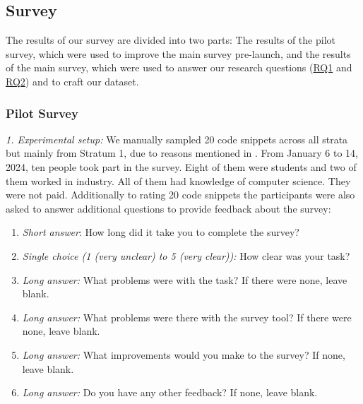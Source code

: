 \documentclass[%
class=scrreprt,
chapterprefix=false,%
open=right,%
twoside=false,%
paper=a4,%
logofile={Logo\_zentral\_farbig\_EN.png},%
thesistype=master,%
UKenglish,%
]{se2thesis}
\theoremstyle{definition}
\newcommand{\rdh}{REDEC\xspace}
\begin{document}
\subsection{Survey} \label{Survey}
	The results of our survey are divided into two parts: The results of the pilot survey, which were used to improve the main survey pre-launch, and the results of the main survey, which were used to answer our research questions (\hyperref[mined-well]{RQ1} and \hyperref[modify-poor]{RQ2}) and to craft our dataset.
	
\subsubsection{Pilot Survey} \label{Pilot Survey}
	
	\textit{1. Experimental setup:}
	We manually sampled 20 code snippets across all strata but mainly from Stratum 1, due to reasons mentioned in . From January 6 to 14, 2024, ten people took part in the survey. Eight of them were students and two of them worked in industry. All of them had knowledge of computer science. They were not paid. Additionally to rating 20 code snippets the participants were also asked to answer additional questions to provide feedback about the survey:
	
	\begin{enumerate}
		\item \textit{Short answer}: How long did it take you to complete the survey?
		\item \textit{Single choice (1 (very unclear) to 5 (very clear)):} How clear was your task?
		\item \textit{Long answer:} What problems were with the task? If there were none, leave blank.
		\item \textit{Long answer:} What problems were there with the survey tool? If there were none, leave blank.
		\item \textit{Long answer:} What improvements would you make to the survey? If none, leave blank.
		\item \textit{Long answer:} Do you have any other feedback? If none, leave blank.
	\end{enumerate}
	
	
	
\end{document}
